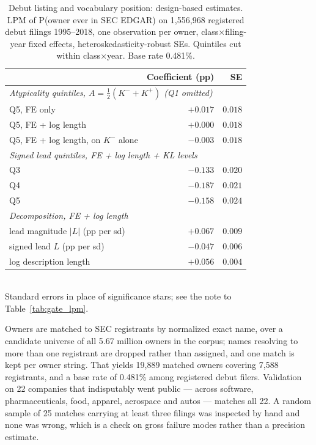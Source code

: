 \begin{table}[!htbp]\centering\small
\caption{Debut listing and vocabulary position: design-based estimates.
LPM of P(owner ever in SEC EDGAR) on 1{,}556{,}968 registered debut
filings 1995--2018, one observation per owner, class$\times$filing-year
fixed effects, heteroskedasticity-robust SEs. Quintiles cut within
class$\times$year. Base rate 0.481\%.}
\label{tab:edgar}
\begin{tabular}{lrr}
\toprule
 & Coefficient (pp) & SE \\
\midrule
\multicolumn{3}{l}{\emph{Atypicality quintiles, $A = \tfrac{1}{2}(K^{-}+K^{+})$ (Q1 omitted)}} \\
\quad Q5, FE only & $+0.017$ & $0.018$ \\
\quad Q5, FE + log length & $+0.000$ & $0.018$ \\
\quad Q5, FE + log length, on $K^{-}$ alone & $-0.003$ & $0.018$ \\
\midrule
\multicolumn{3}{l}{\emph{Signed lead quintiles, FE + log length + KL levels}} \\
\quad Q3 & $-0.133$ & $0.020$ \\
\quad Q4 & $-0.187$ & $0.021$ \\
\quad Q5 & $-0.158$ & $0.024$ \\
\midrule
\multicolumn{3}{l}{\emph{Decomposition, FE + log length}} \\
\quad lead magnitude $|L|$ (pp per sd) & $+0.067$ & $0.009$ \\
\quad signed lead $L$ (pp per sd) & $-0.047$ & $0.006$ \\
\quad log description length & $+0.056$ & $0.004$ \\
\bottomrule
\end{tabular}
\\[0.3em]\footnotesize Standard errors in place of significance stars; see
the note to Table~\ref{tab:gate_lpm}.
\end{table}

Owners are matched to SEC registrants by normalized exact name, over a
candidate universe of all 5.67 million owners in the corpus; names
resolving to more than one registrant are dropped rather than assigned,
and one match is kept per owner string. That yields 19{,}889 matched
owners covering 7{,}588 registrants, and a base rate of 0.481\% among
registered debut filers. Validation on 22 companies that indisputably went
public --- across software, pharmaceuticals, food, apparel, aerospace and
autos --- matches all 22. A random sample of 25 matches carrying at least
three filings was inspected by hand and none was wrong, which is a check
on gross failure modes rather than a precision estimate.


